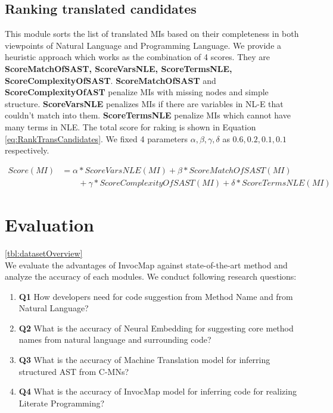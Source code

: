 \documentclass[sigconf,review,anonymous]{article}
\begin{document}
\subsection{Ranking translated candidates }
This module sorts the list of translated MIs based on their completeness in both viewpoints of Natural Language and Programming Language. We provide a heuristic approach which works as the combination of 4 scores. They are \textbf{ScoreMatchOfSAST, ScoreVarsNLE,  ScoreTermsNLE, ScoreComplexityOfSAST}. \textbf{ScoreMatchOfSAST }and \textbf{ScoreComplexityOfAST} penalize MIs with missing nodes and simple structure. \textbf{ScoreVarsNLE} penalizes MIs if there are variables in NL-E that couldn't match into them. \textbf{ScoreTermsNLE} penalize MIs which cannot have many terms in NLE. The total score for raking is shown in Equation \ref{eq:RankTransCandidates}. We fixed 4 parameters \textbf{$\alpha  , \beta , \gamma , \delta $} as \textbf{$0.6, 0.2, 0.1, 0.1$} respectively.

\begin{align}
 Score(MI) &= \alpha*ScoreVarsNLE(MI) + \beta*ScoreMatchOfSAST(MI) \nonumber\\ &\qquad +\gamma*ScoreComplexityOfSAST(MI) + \delta*ScoreTermsNLE(MI) \label{eq:RankTransCandidates}
\end{align}

\section{Evaluation}
\ref{tbl:datasetOverview} \\
We evaluate the advantages of InvocMap against state-of-the-art method and analyze the accuracy of each modules. We conduct following research questions:
\begin{enumerate}[\indent {}]
        \item \textbf{Q1}  How developers need for code suggestion from Method Name and from Natural Language?
        \item \textbf{Q2} What is the accuracy of Neural Embedding for suggesting core method names  from natural language and surrounding code?
        \item \textbf{Q3} What is the accuracy of Machine Translation model for inferring structured AST from C-MNs?
        \item \textbf{Q4} What is the accuracy of InvocMap model for inferring code for realizing Literate Programming?
\end{enumerate}
\end{document}
